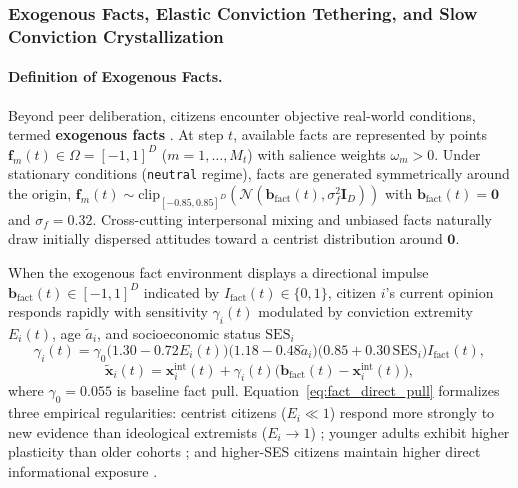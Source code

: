 \documentclass{article}
\begin{document}
\subsubsection{Exogenous Facts, Elastic Conviction Tethering, and Slow Conviction Crystallization}
\label{subsubsec:facts_and_tether}

\paragraph{Definition of Exogenous Facts.}
Beyond peer deliberation, citizens encounter objective real-world conditions, termed \textbf{exogenous facts} \citep{mullainathan2005market, gentzkow2006media}. At step $t$, available facts are represented by points $\mathbf{f}_m(t) \in \Omega = [-1, 1]^D$ ($m = 1, \dots, M_t$) with salience weights $\omega_m > 0$. Under stationary conditions (\texttt{neutral} regime), facts are generated symmetrically around the origin, $\mathbf{f}_m(t) \sim \mathrm{clip}_{[-0.85, 0.85]^D}(\mathcal{N}(\mathbf{b}_{\mathrm{fact}}(t), \sigma_f^2 \mathbf{I}_D))$ with $\mathbf{b}_{\mathrm{fact}}(t) = \mathbf{0}$ and $\sigma_f = 0.32$. Cross-cutting interpersonal mixing and unbiased facts naturally draw initially dispersed attitudes toward a centrist distribution around $\mathbf{0}$.

When the exogenous fact environment displays a directional impulse $\mathbf{b}_{\mathrm{fact}}(t) \in [-1, 1]^D$ indicated by $I_{\mathrm{fact}}(t) \in \{0, 1\}$, citizen $i$'s current opinion responds rapidly with sensitivity $\gamma_i(t)$ modulated by conviction extremity $E_i(t)$, age $\tilde{a}_i$, and socioeconomic status $\mathrm{SES}_i$ \citep{zaller1992nature, howe2017attitude}
\begin{equation}
    \gamma_i(t) = \gamma_0 \big(1.30 - 0.72 E_i(t)\big)\big(1.18 - 0.48\tilde{a}_i\big)\big(0.85 + 0.30\,\mathrm{SES}_i\big) I_{\mathrm{fact}}(t),
    \label{eq:fact_direct_pull}
\end{equation}
\begin{equation}
    \tilde{\mathbf{x}}_i(t) = \mathbf{x}_i^{\mathrm{int}}(t) + \gamma_i(t)\big(\mathbf{b}_{\mathrm{fact}}(t) - \mathbf{x}_i^{\mathrm{int}}(t)\big),
    \label{eq:opinion_fact_response}
\end{equation}
where $\gamma_0 = 0.055$ is baseline fact pull. Equation~\eqref{eq:fact_direct_pull} formalizes three empirical regularities: centrist citizens ($E_i \ll 1$) respond more strongly to new evidence than ideological extremists ($E_i \to 1$) \citep{howe2017attitude}; younger adults exhibit higher plasticity than older cohorts \citep{alwin1991aging}; and higher-SES citizens maintain higher direct informational exposure \citep{zaller1992nature}.
\end{document}
